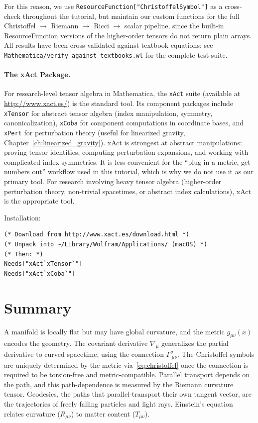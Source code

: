 \begin{remark}
For this reason, we use \texttt{ResourceFunction["ChristoffelSymbol"]}
as a cross-check throughout the tutorial, but maintain our custom
functions for the full Christoffel $\to$ Riemann $\to$ Ricci $\to$
scalar pipeline, since the built-in ResourceFunction versions of the
higher-order tensors do not return plain arrays.  All results have been
cross-validated against textbook equations; see
\texttt{Mathematica/verify\_against\_textbooks.wl} for the complete
test suite.
\end{remark}

\paragraph{The xAct Package.}
For research-level tensor algebra in Mathematica, the
\texttt{xAct} suite (available at \url{http://www.xact.es/}) is the
standard tool.  Its component packages include
\texttt{xTensor} for abstract tensor algebra (index
manipulation, symmetry, canonicalization),
\texttt{xCoba} for component computations in coordinate bases, and
\texttt{xPert} for perturbation theory (useful for linearized
gravity, Chapter~\ref{ch:linearized_gravity}).
xAct is strongest at abstract manipulations: proving tensor
identities, computing perturbation expansions, and working with
complicated index symmetries.  It is less convenient for the
``plug in a metric, get numbers out'' workflow used in this tutorial,
which is why we do not use it as our primary tool.  For
research involving heavy tensor algebra (higher-order perturbation
theory, non-trivial spacetimes, or abstract index calculations), xAct
is the appropriate tool.

Installation:
\begin{lstlisting}[style=mathematica]
(* Download from http://www.xact.es/download.html *)
(* Unpack into ~/Library/Wolfram/Applications/ (macOS) *)
(* Then: *)
Needs["xAct`xTensor`"]
Needs["xAct`xCoba`"]
\end{lstlisting}


\section{Summary}
\label{sec:dg_summary}

A manifold is locally flat but may have global curvature, and the
metric $g_{\mu\nu}(x)$ encodes the geometry.
The covariant derivative $\nabla_\mu$ generalizes the partial
derivative to curved spacetime, using the connection
$\Gamma^\sigma_{\ \mu\nu}$.
The Christoffel symbols are uniquely determined by the metric
via~\eqref{eq:christoffel} once the connection is required to be
torsion-free and metric-compatible.
Parallel transport depends on the path, and this path-dependence is
measured by the Riemann curvature tensor.
Geodesics, the paths that parallel-transport their own tangent
vector, are the trajectories of freely falling particles
and light rays.
Einstein's equation relates curvature ($R_{\mu\nu}$) to
matter content ($T_{\mu\nu}$).


